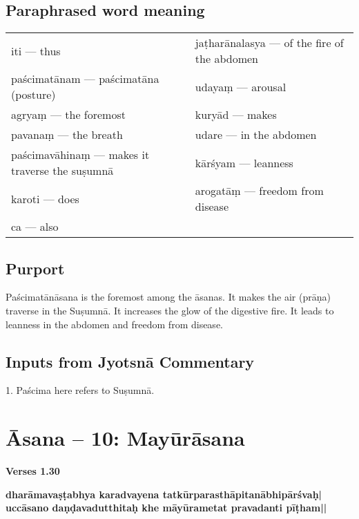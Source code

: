 \subsection*{Paraphrased word meaning}
\vspace{-10pt}

\begin{longtable}{>{\noindent\raggedright}p{5cm}>{\noindent\raggedright}p{5cm}}
iti --- thus & jaṭharānalasya --- of the fire of the abdomen\tabularnewline
paścimatānam --- paścimatāna (posture) & udayaṃ --- arousal\tabularnewline
agryaṃ  --- the foremost &  kuryād --- makes\tabularnewline
pavanaṃ --- the breath  & udare --- in the abdomen\tabularnewline
paścimavāhinaṃ --- makes it traverse the suṣumnā & kārśyam --- leanness\tabularnewline
karoti --- does & arogatāṃ --- freedom from disease \tabularnewline
ca --- also & 
\end{longtable}
\vspace{-10pt}

\subsection*{Purport}
\vspace{-10pt}

Paścimatānāsana is the foremost among the āsanas. It makes the air (prāṇa) traverse in the Suṣumnā. It increases the glow of the digestive fire. It leads to leanness in the abdomen and freedom from disease.
\vspace{-10pt}

\subsection*{Inputs from Jyotsnā Commentary}
\vspace{-10pt}

1. Paścima here refers to Suṣumnā.
\newpage

\section*{Āsana -- 10: Mayūrāsana}


\noindent 
\textbf{Verses 1.30}

\begin{shloka}
\textbf{dharāmavaṣṭabhya karadvayena tatkūrparasthāpitanābhipārśvaḥ|}\\
\textbf{uccāsano daṇḍavadutthitaḥ khe māyūrametat pravadanti pīṭham||}
\end{shloka}

